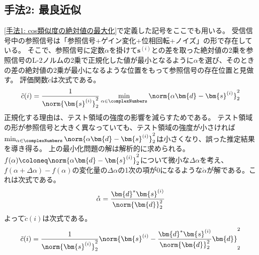         \subsection{手法2: 最良近似}
            \ref{手法1: cos類似度の絶対値の最大化}で定義した記号をここでも用いる。
            受信信号中の参照信号は「参照信号+ゲイン変化+位相回転+ノイズ」の形で存在している。
            そこで、参照信号に定数$\alpha$を掛けて$\bm{s}^{(i)}$との差を取った絶対値の2乗を参照信号のL-2ノルムの2乗で正規化した値が最小となるように$\alpha$を選び、そのときの差の絶対値の2乗が最小になるような位置をもって参照信号の存在位置と見做す。
            評価関数$\tilde{c}$は次式である。
            \[ \tilde{c}(i) = \frac{1}{\norm{\bm{s}^{(i)}}_2^2}\min_{\alpha \in \complexNumbers}\norm{\alpha\bm{d} - \bm{s}^{(i)}}_2^2 \]
            正規化する理由は、テスト領域の強度の影響を減らすためである。
            テスト領域の形が参照信号と大きく異なっていても、テスト領域の強度が小さければ$\min_{\alpha \in \complexNumbers}\norm{\alpha\bm{d} - \bm{s}^{(i)}}_2^2$は小さくなり、誤った推定結果を導き得る。
            上の最小化問題の解は解析的に求められる。
            $f(\alpha) \coloneq \norm{\alpha\bm{d} - \bm{s}^{(i)}}_2^2$について微小な$\Delta\alpha$を考え、$f(\alpha+\Delta\alpha) - f(\alpha)$の変化量の$\Delta\alpha$の1次の項が0になるような$\mathring{\alpha}$が解である。これは次式である。
            \[
                \mathring{\alpha} = \frac{\bm{d}^*\bm{s}^{(i)}}{\norm{\bm{d}}_2^2}
            \]
            よって$\tilde{c}(i)$は次式である。
            \[ \tilde{c}(i) = \frac{1}{\norm{\bm{s}^{(i)}}_2^2}\norm{\bm{s}^{(i)} - \frac{\bm{d}^*\bm{s}^{(i)}}{\norm{\bm{d}}_2^2}\bm{d}}_2^2 \]

